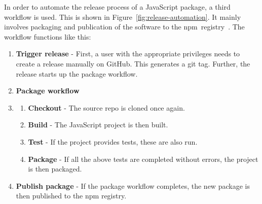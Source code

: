 In order to automate the release process of a JavaScript package, a third workflow is used. This is shown in Figure~\ref{fig:release-automation}. It mainly involves packaging and publication of the software to the npm~registry~\cite{npm-registry}. The workflow functions like this:
\begin{enumerate}
    \item \textbf{Trigger release} - First, a user with the appropriate privileges needs to create a release manually on GitHub. This generates a git tag. Further, the release starts up the package workflow.
    \item \textbf{Package workflow}
    \item \begin{enumerate}
        \item \textbf{Checkout} - The source repo is cloned once again.
        \item \textbf{Build} - The JavaScript project is then built.
        \item \textbf{Test} - If the project provides tests, these are also run.
        \item \textbf{Package} - If all the above tests are completed without errors, the project is then packaged.
    \end{enumerate}
    \item \textbf{Publish package} - If the package workflow completes, the new package is then published to the npm registry.
\end{enumerate}

